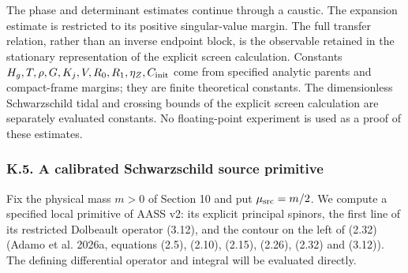 \documentclass[
  english,
  11pt,
  reqno]{amsart}
\begin{document}
The phase and determinant estimates continue through a caustic. The
expansion estimate is restricted to its positive singular-value margin.
The full transfer relation, rather than an inverse endpoint block, is
the observable retained in the stationary representation of the explicit
screen calculation. Constants
\(H_g,T,\rho,G,K_j,V,R_0,R_1,\eta_Z,C_{\rm init}\) come from specified
analytic parents and compact-frame margins; they are finite theoretical
constants. The dimensionless Schwarzschild tidal and crossing bounds of
the explicit screen calculation are separately evaluated constants. No
floating-point experiment is used as a proof of these estimates.

\protect{}\label{sec:sh-r1-primitive-comparison}

\subsubsection{K.5. A calibrated Schwarzschild source
primitive}\label{k.5.-a-calibrated-schwarzschild-source-primitive}

Fix the physical mass \(m>0\) of Section 10 and put
\(\mu_{\rm src}=m/2\). We compute a specified local primitive of AASS
v2: its explicit principal spinors, the first line of its restricted
Dolbeault operator (3.12), and the contour on the left of (2.32) (Adamo
et al. 2026a, equations (2.5), (2.10), (2.15), (2.26), (2.32) and
(3.12)). The defining differential operator and integral will be
evaluated directly.
\end{document}
